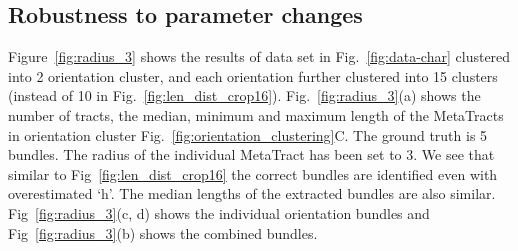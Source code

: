 \subsection{Robustness to parameter changes}
\label{subsec:robustness}
Figure~\ref{fig:radius_3} shows the results of data set in Fig.~\ref{fig:data-char} clustered into 2 orientation cluster, and each orientation further clustered into 15 clusters (instead of 10 in Fig.~\ref{fig:len_dist_crop16}). Fig.~\ref{fig:radius_3}(a) shows the number of tracts, the median, minimum and maximum length of the MetaTracts in orientation cluster Fig.~\ref{fig:orientation_clustering}C.
The ground truth is 5 bundles. The radius of the individual MetaTract has been set to 3. We see that similar to Fig~\ref{fig:len_dist_crop16} the correct bundles are identified even with overestimated `h'. The median lengths of the extracted bundles are also similar. Fig~\ref{fig:radius_3}(c, d) shows the individual orientation bundles and Fig~\ref{fig:radius_3}(b) shows the combined bundles.
